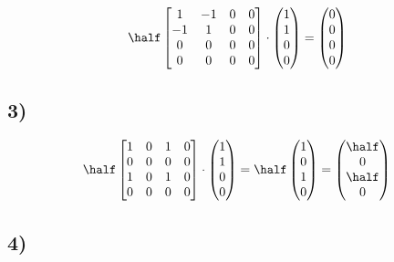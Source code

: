 \begin{align*}
\half 
\left[
\begin{matrix}
1 & -1 & 0 & 0 \\ 
-1 & 1 & 0 & 0 \\ 
0 & 0 & 0 & 0 \\ 
0 & 0 & 0 & 0
\end{matrix} 
\right]
\cdot
\left(
\begin{matrix}
1 \\ 
1 \\ 
0 \\ 
0
\end{matrix} 
\right)
=
\left(
\begin{matrix}
0 \\ 
0 \\ 
0 \\ 
0
\end{matrix} 
\right)
\end{align*}


\subsection*{3)}

\begin{align*}
\half 
\left[
\begin{matrix}
1 & 0 & 1 & 0 \\ 
0 & 0 & 0 & 0 \\ 
1 & 0 & 1 & 0 \\ 
0 & 0 & 0 & 0
\end{matrix} 
\right]
\cdot
\left(
\begin{matrix}
1 \\ 
1 \\ 
0 \\ 
0
\end{matrix} 
\right)
=
\half
\left(
\begin{matrix}
1 \\ 
0 \\ 
1 \\ 
0
\end{matrix} 
\right)
=
\left(
\begin{matrix}
\half \\ 
0 \\ 
\half \\ 
0
\end{matrix} 
\right)
\end{align*}


\subsection*{4)}

